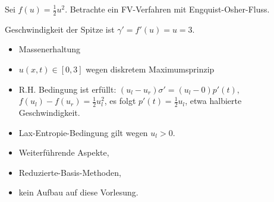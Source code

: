 \begin{ex*}
    Sei $f(u) = \frac{1}{2} u^2$.
    Betrachte ein FV-Verfahren mit Engquist-Osher-Fluss.


    Geschwindigkeit der Spitze ist $\gamma' = f'(u) = u = 3$.
    \begin{itemize}
        \item
            Massenerhaltung
        \item
            $u(x,t) \in [0,3]$ wegen diskretem Maximumsprinzip
        \item
            R.H. Bedingung ist erfüllt:
            \begin{math}
                (u_l - u_r) \sigma' = (u_l - 0) p'(t),
            \end{math}
            $f(u_l) - f(u_r) = \frac{1}{2} u_l^2$, es folgt $p'(t) = \frac{1}{2} u_l$, etwa halbierte Geschwindigkeit.
        \item
            Lax-Entropie-Bedingung gilt wegen $u_l > 0$.
    \end{itemize}
\end{ex*}

\begin{note}
    \begin{itemize}
        \item
            Weiterführende Aspekte,
        \item
            Reduzierte-Basis-Methoden,
        \item
            kein Aufbau auf diese Vorlesung.
    \end{itemize}
\end{note}
